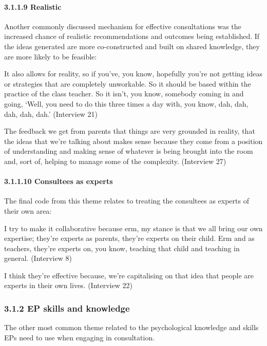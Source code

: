 \documentclass[
]{article}
\begin{document}
\hypertarget{realistic}{%
\paragraph{3.1.1.9 Realistic}\label{realistic}}

Another commonly discussed mechanism for effective consultations was the
increased chance of realistic recommendations and outcomes being
established. If the ideas generated are more co-constructed and built on
shared knowledge, they are more likely to be feasible:

It also allows for reality, so if you've, you know, hopefully you're not
getting ideas or strategies that are completely unworkable. So it should
be based within the practice of the class teacher. So it isn't, you
know, somebody coming in and going, `Well, you need to do this three
times a day with, you know, dah, dah, dah, dah, dah.' (Interview 21)

The feedback we get from parents that things are very grounded in
reality, that the ideas that we're talking about makes sense because
they come from a position of understanding and making sense of whatever
is being brought into the room and, sort of, helping to manage some of
the complexity. (Interview 27)

\hypertarget{consultees-as-experts}{%
\paragraph{3.1.1.10 Consultees as experts}\label{consultees-as-experts}}

The final code from this theme relates to treating the consultees as
experts of their own area:

I try to make it collaborative because erm, my stance is that we all
bring our own expertise; they're experts as parents, they're experts on
their child. Erm and as teachers, they're experts on, you know, teaching
that child and teaching in general. (Interview 8)

I think they're effective because, we're capitalising on that idea that
people are experts in their own lives. (Interview 22)

\hypertarget{ep-skills-and-knowledge}{%
\subsubsection{3.1.2 EP skills and
knowledge}\label{ep-skills-and-knowledge}}

The other most common theme related to the psychological knowledge and
skills EPs need to use when engaging in consultation.
\end{document}
